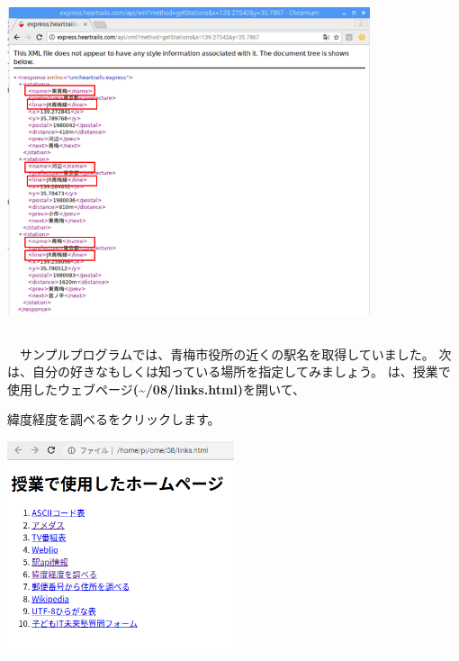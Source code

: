 \begin{center}
\includegraphics[width=0.8\textwidth]{./text08-img/textbook-img052.png}

\end{center}
\clearpage\subsection*{\theQuestion\label{Q:station}}
\ \ サンプルプログラムでは、青梅市役所の近くの駅名を取得していました。
次は、自分の好きなもしくは知っている場所を指定してみましょう。
は、授業で使用したウェブページ\textbf{({\textasciitilde}/08/links.html)}を開いて、

緯度経度を調べるをクリックします。



\begin{center}
\includegraphics[width=0.5\textwidth]{./text08-img/textbook-img017.png}

\end{center}


